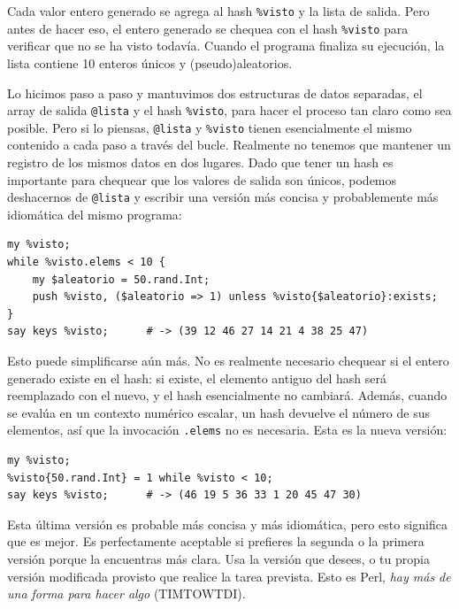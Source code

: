 Cada valor entero generado se agrega al hash \verb|%visto| 
y la lista de salida. Pero antes de hacer eso, el entero 
generado se chequea con el hash \verb|%visto| para verificar
que no se ha visto todavía. Cuando el programa finaliza su 
ejecución, la lista contiene 10 enteros únicos y (pseudo)aleatorios.

Lo hicimos paso a paso y mantuvimos dos estructuras de datos 
separadas, el array de salida \verb|@lista| y el hash \verb|%visto|,
para hacer el proceso tan claro como sea posible. Pero si lo piensas,
\verb|@lista| y \verb|%visto| tienen esencialmente el mismo contenido
a cada paso a través del bucle. Realmente no tenemos que mantener un
registro de los mismos datos en dos lugares. Dado que tener un hash
es importante para chequear que los valores de salida son únicos, 
podemos deshacernos de \verb|@lista| y escribir una versión más
concisa y probablemente más idiomática del mismo programa:

\begin{verbatim}
my %visto;
while %visto.elems < 10 {
	my $aleatorio = 50.rand.Int;
	push %visto, ($aleatorio => 1) unless %visto{$aleatorio}:exists;
}
say keys %visto;      # -> (39 12 46 27 14 21 4 38 25 47)
\end{verbatim}

Esto puede simplificarse aún más. No es realmente necesario
chequear si el entero generado existe en el hash: si existe,
el elemento antiguo del hash será reemplazado con el nuevo, 
y el hash esencialmente no cambiará. Además, cuando se evalúa
en un contexto numérico escalar, un hash devuelve el número de
sus elementos, así que la invocación {\tt .elems} no es necesaria.
Esta es la nueva versión:

\begin{verbatim}
my %visto;
%visto{50.rand.Int} = 1 while %visto < 10;
say keys %visto;      # -> (46 19 5 36 33 1 20 45 47 30)
\end{verbatim}

Esta última versión es probable más concisa y más idiomática,
pero esto significa que es mejor. Es perfectamente aceptable
si prefieres la segunda o la primera versión porque la encuentras
más clara. Usa la versión que desees, o tu propia versión modificada
provisto que realice la tarea prevista. Esto es Perl, \emph{
hay más de una forma para hacer algo} (TIMTOWTDI).


